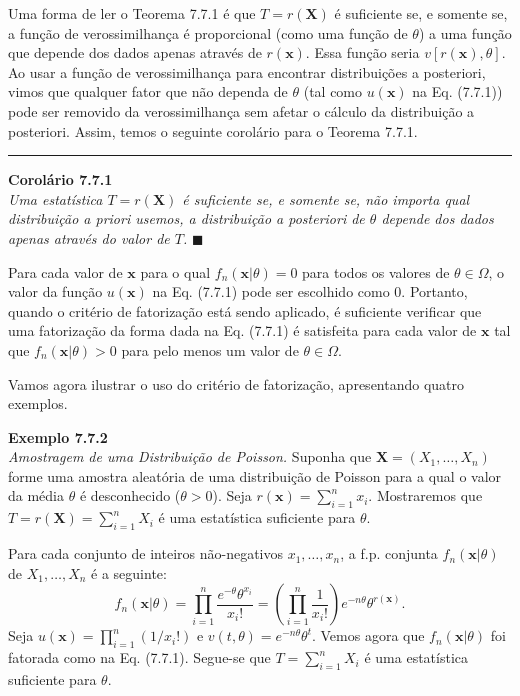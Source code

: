 Uma forma de ler o Teorema 7.7.1 é que $T = r(\mathbf{X})$ é suficiente se, e somente se, a função de verossimilhança é proporcional (como uma função de $\theta$) a uma função que depende dos dados apenas através de $r(\mathbf{x})$. Essa função seria $v[r(\mathbf{x}), \theta]$. Ao usar a função de verossimilhança para encontrar distribuições a posteriori, vimos que qualquer fator que não dependa de $\theta$ (tal como $u(\mathbf{x})$ na Eq. (7.7.1)) pode ser removido da verossimilhança sem afetar o cálculo da distribuição a posteriori. Assim, temos o seguinte corolário para o Teorema 7.7.1.

\vspace{\baselineskip}
\hrule
\vspace{\baselineskip}

\noindent \textbf{Corolário 7.7.1} \\
\textit{Uma estatística $T=r(\mathbf{X})$ é suficiente se, e somente se, não importa qual distribuição a priori usemos, a distribuição a posteriori de $\theta$ depende dos dados apenas através do valor de $T$.} \hfill $\blacksquare$

\vspace{\baselineskip}
Para cada valor de $\mathbf{x}$ para o qual $f_n(\mathbf{x}|\theta)=0$ para todos os valores de $\theta \in \Omega$, o valor da função $u(\mathbf{x})$ na Eq. (7.7.1) pode ser escolhido como 0. Portanto, quando o critério de fatorização está sendo aplicado, é suficiente verificar que uma fatorização da forma dada na Eq. (7.7.1) é satisfeita para cada valor de $\mathbf{x}$ tal que $f_n(\mathbf{x}|\theta) > 0$ para pelo menos um valor de $\theta \in \Omega$.

Vamos agora ilustrar o uso do critério de fatorização, apresentando quatro exemplos.

\vspace{\baselineskip}

\noindent \textbf{Exemplo 7.7.2} \\
\textit{Amostragem de uma Distribuição de Poisson.} Suponha que $\mathbf{X}=(X_1, \dots, X_n)$ forme uma amostra aleatória de uma distribuição de Poisson para a qual o valor da média $\theta$ é desconhecido ($\theta>0$). Seja $r(\mathbf{x}) = \sum_{i=1}^{n} x_i$. Mostraremos que $T=r(\mathbf{X}) = \sum_{i=1}^{n} X_i$ é uma estatística suficiente para $\theta$.

Para cada conjunto de inteiros não-negativos $x_1, \dots, x_n$, a f.p. conjunta $f_n(\mathbf{x}|\theta)$ de $X_1, \dots, X_n$ é a seguinte:
$$ f_n(\mathbf{x}|\theta) = \prod_{i=1}^{n} \frac{e^{-\theta}\theta^{x_i}}{x_i!} = \left(\prod_{i=1}^{n} \frac{1}{x_i!}\right) e^{-n\theta}\theta^{r(\mathbf{x})}. $$
Seja $u(\mathbf{x}) = \prod_{i=1}^{n}(1/x_i!)$ e $v(t, \theta)=e^{-n\theta}\theta^t$. Vemos agora que $f_n(\mathbf{x}|\theta)$ foi fatorada como na Eq. (7.7.1). Segue-se que $T=\sum_{i=1}^{n} X_i$ é uma estatística suficiente para $\theta$.


